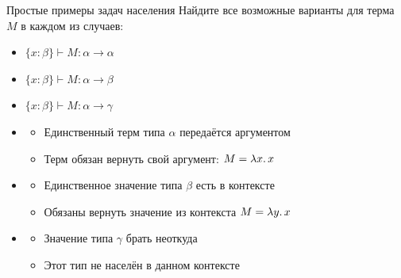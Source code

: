 
    \begin{frame}{Простые примеры задач населения}
        Найдите все возможные варианты для терма $M$ в каждом из случаев:
        \begin{itemize}
            \item[\todo] $\{x: \beta\} \vdash M: \alpha \to \alpha$
            \item[\todo] $\{x: \beta\} \vdash M: \alpha \to \beta$
            \item[\todo] $\{x: \beta\} \vdash M: \alpha \to \gamma$
            \item[\answer] \pause
            \begin{itemize}
                \item Единственный терм типа $\alpha$ передаётся аргументом
                \item Терм обязан вернуть свой аргумент: $M = \lambda x\ldotp x$
            \end{itemize}
            \item[\answer] \pause
            \begin{itemize}
                \item Единственное значение типа $\beta$ есть в контексте
                \item Обязаны вернуть значение из контекста $M = \lambda y\ldotp x$
            \end{itemize}
            \item[\answer] \pause
            \begin{itemize}
                \item Значение типа $\gamma$ брать неоткуда
                \item Этот тип не населён в данном контексте
            \end{itemize}
        \end{itemize}
    \end{frame}



